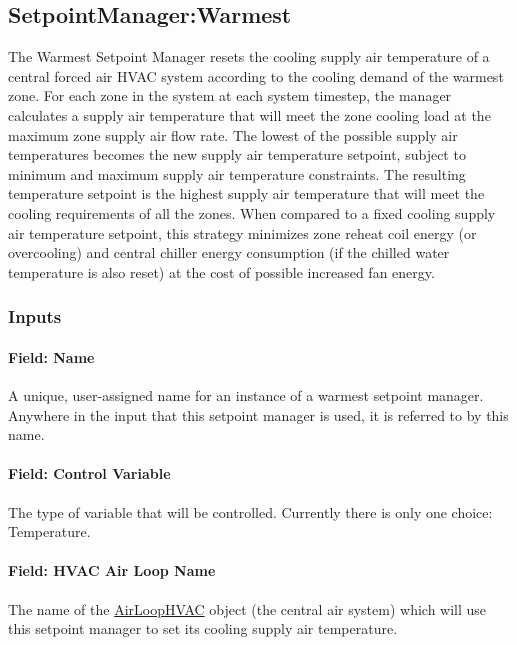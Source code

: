 \subsection{SetpointManager:Warmest}\label{setpointmanagerwarmest}

The Warmest Setpoint Manager resets the cooling supply air temperature of a central forced air HVAC system according to the cooling demand of the warmest zone. For each zone in the system at each system timestep, the manager calculates a supply air temperature that will meet the zone cooling load at the maximum zone supply air flow rate. The lowest of the possible supply air temperatures becomes the new supply air temperature setpoint, subject to minimum and maximum supply air temperature constraints. The resulting temperature setpoint is the highest supply air temperature that will meet the cooling requirements of all the zones. When compared to a fixed cooling supply air temperature setpoint, this strategy minimizes zone reheat coil energy (or overcooling) and central chiller energy consumption (if the chilled water temperature is also reset) at the cost of possible increased fan energy.

\subsubsection{Inputs}\label{inputs-10-018}

\paragraph{Field: Name}\label{field-name-10-015}

A unique, user-assigned name for an instance of a warmest setpoint manager. Anywhere in the input that this setpoint manager is used, it is referred to by this name.

\paragraph{Field: Control Variable}\label{field-control-variable-10}

The type of variable that will be controlled. Currently there is only one choice: Temperature.

\paragraph{Field: HVAC Air Loop Name}\label{field-hvac-air-loop-name}

The name of the \hyperref[airloophvac]{AirLoopHVAC} object (the central air system) which will use this setpoint manager to set its cooling supply air temperature.

